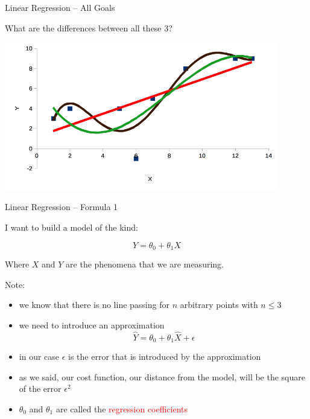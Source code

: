 \documentclass{beamer}
\begin{document}
\begin{frame}
{\centerline{Linear Regression -- All Goals}}

What are the differences between all these 3?

\begin{center}
\includegraphics[width=12cm]{A2022.IDSEPC.RegressioneLineare/LinearRegression_O35.png}
\end{center}

\end{frame}




\begin{frame}
{\centerline{Linear Regression -- Formula 1}}
I want to build a model of the kind:

$$ Y = \theta_0 + \theta_1 X $$

Where $X$ and $Y$ are the phenomena that we are measuring.\\
\vspace*{0.3cm}

Note:
\begin{itemize}
\item we know that there is no line passing for $n$ arbitrary points with $n \leq 3$
\item we need to introduce an approximation
$$ \hat{Y} = \theta_0 + \theta_1 \hat{X} + \epsilon $$
\item in our case $\epsilon$ is the error that is introduced by the approximation
\item as we said, our cost function, our distance from the model, will be the square of the error $\epsilon^2$
\item $ \theta_0$ and $\theta_1$ are called the \textcolor{red}{regression coefficients}
\end{itemize}

\end{frame}
\end{document}
